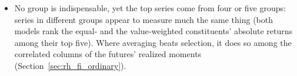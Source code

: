 \begin{itemize}
\begin{itemize}
    changes its ordinary-day loss against HAR\,+\,RM\,+\,FOMC by \rhabRidgeFullVsAddRmFomcOrdPct\%
    ($p = \rhabRidgeFullVsAddRmFomcOrdP$). In the boosted trees five series recover more of the remainder than ten
    principal components of all of them, and under the reading fixed before the ladder was scored XGBoost's
    remainder is \rhbyLXgbReading{} and LightGBM's \rhbyLLgbmReading{} ($R = \rhbyLLgbmKTwentyOrdR$ with twenty
    series): neither is dense.
  \item No group is indispensable, yet the top series come from four or five groups: series in different groups
    appear to measure much the same thing (both models rank the equal- and the value-weighted constituents'
    absolute returns among their top five). Where averaging beats selection, it does so among the correlated
    columns of the futures' realized moments (Section~\ref{sec:rh_fi_ordinary}).
  \end{itemize}
\end{itemize}

